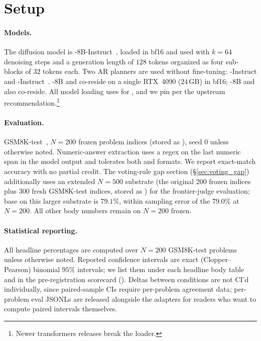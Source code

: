 \section{Setup}
\label{sec:setup}

\paragraph{Models.}
The diffusion model is \LLaDA{}-8B-Instruct~\citep{nie2025llada},
loaded in bf16 and used with $k{=}64$ denoising steps and a
generation length of $128$ tokens organized as four sub-blocks of
$32$ tokens each.  Two AR planners are used without fine-tuning:
-Instruct and -Instruct~\citep{qwen2024report}.
\LLaDA{}-8B and  co-reside on a single RTX~4090 ($24$\,GB)
in bf16; \LLaDA{}-8B and  also co-reside.  All model
loading uses  for \LLaDA{}, and we
pin  per the upstream
recommendation.\footnote{Newer transformers releases break the
\LLaDA{}  loader.}

\paragraph{Evaluation.}
GSM8K-test~\citep{cobbe2021gsm8k}, $N{=}200$ frozen problem indices
(stored as ), seed $0$ unless
otherwise noted.  Numeric-answer extraction uses a regex on the
last numeric span in the model output and tolerates both
 and  formats.  We report
exact-match accuracy with no partial credit.  The voting-rule gap
section (\S\ref{sec:voting_gap}) additionally uses an extended
$N{=}500$ substrate (the original $200$ frozen indices plus $300$
fresh GSM8K-test indices, stored as )
for the frontier-judge evaluation; base \cmaj{} on this larger
substrate is $79.1\%$, within sampling error of the $79.0\%$ at
$N{=}200$.  All other body numbers remain on $N{=}200$ frozen.

\paragraph{Statistical reporting.}
All headline percentages are computed over $N{=}200$ GSM8K-test
problems unless otherwise noted.  Reported confidence intervals
are exact (Clopper--Pearson) binomial $95\%$ intervals; we list
them under each headline body table and in the pre-registration
scorecard ().  Deltas between conditions are
not CI'd individually, since paired-sample CIs require per-problem
agreement data; per-problem eval JSONLs are released alongside the
adapters for readers who want to compute paired intervals
themselves.

